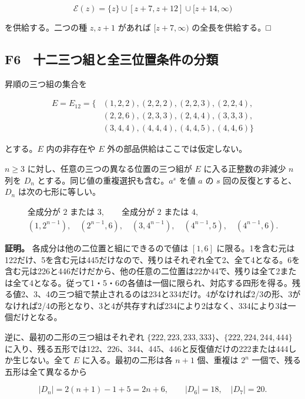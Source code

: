 \documentclass[
  10pt,
  a4paper,
]{article}
\begin{document}
\[
\mathcal E(z)=\{z\}\cup[z+7,z+12]\cup[z+14,\infty)
\tag{F5.4}
\]

を供給する。二つの種 \(z,z+1\) があれば \([z+7,\infty)\)
の全長を供給する。□

\subsection{F6　十二三つ組と全三位置条件の分類}\label{f6-ux5341ux4e8cux4e09ux3064ux7d44ux3068ux5168ux4e09ux4f4dux7f6eux6761ux4ef6ux306eux5206ux985e}

昇順の三つ組の集合を

\[
\begin{aligned}
E=E_{12}=\{&(1,2,2),(2,2,2),(2,2,3),(2,2,4),\\
&(2,2,6),(2,3,3),(2,4,4),(3,3,3),\\
&(3,4,4),(4,4,4),(4,4,5),(4,4,6)\}
\end{aligned}
\tag{F6.1}
\]

とする。\(E\) 内の非存在や \(E\) 外の部品供給はここでは仮定しない。

\(n\ge3\) に対し、任意の三つの異なる位置の三つ組が \(E\)
に入る正整数の非減少 \(n\) 列を \(D_n\)
とする。同じ値の重複選択も含む。\(a^s\) を値 \(a\) の \(s\)
回の反復とすると、\(D_n\) は次の七形に等しい。

\[
\begin{gathered}
\text{全成分が }2\text{ または }3,\qquad
\text{全成分が }2\text{ または }4,\\
(1,2^{n-1}),\quad(2^{n-1},6),\quad(3,4^{n-1}),\quad
(4^{n-1},5),\quad(4^{n-1},6).
\end{gathered}
\tag{F6.2}
\]

\textbf{証明。} 各成分は他の二位置と組にできるので値は \([1,6]\)
に限る。1を含む元は122だけ、5を含む元は445だけなので、残りはそれぞれ全て2、全て4となる。6を含む元は226と446だけだから、他の任意の二位置は22か44で、残りは全て2または全て4となる。従って1・5・6の各値は一個に限られ、対応する四形を得る。残る値2、3、4の三つ組で禁止されるのは234と334だけ。4がなければ2/3の形、3がなければ2/4の形となり、3と4が共存すれば234により2はなく、334により3は一個だけとなる。

逆に、最初の二形の三つ組はそれぞれ
\(\{222,223,233,333\}\)、\(\{222,224,244,444\}\)
に入り、残る五形では122、226、344、445、446と反復値だけの222または444しか生じない。全て
\(E\) に入る。最初の二形は各 \(n+1\) 個、重複は \(2^n\)
一個で、残る五形は全て異なるから

\[
|D_n|=2(n+1)-1+5=2n+6,\qquad |D_6|=18,\quad |D_7|=20.
\tag{F6.3}
\]
\end{document}
